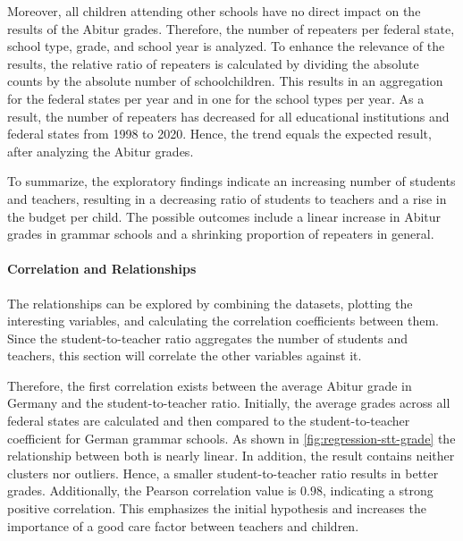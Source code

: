 Moreover, all children attending other schools have no direct impact on the results of the Abitur grades. Therefore, the number of repeaters per federal state, school type, grade, and school year is analyzed. To enhance the relevance of the results, the relative ratio of repeaters is calculated by dividing the absolute counts by the absolute number of schoolchildren. This results in an aggregation for the federal states per year and in one for the school types per year. As a result, the number of repeaters has decreased for all educational institutions and federal states from 1998 to 2020. Hence, the trend equals the expected result, after analyzing the Abitur grades.

To summarize, the exploratory findings indicate an increasing number of students and teachers, resulting in a decreasing ratio of students to teachers and a rise in the budget per child. The possible outcomes include a linear increase in Abitur grades in grammar schools and a shrinking proportion of repeaters in general.

\paragraph{Correlation and Relationships}
The relationships can be explored by combining the datasets, plotting the interesting variables, and calculating the correlation coefficients between them. Since the student-to-teacher ratio aggregates the number of students and teachers, this section will correlate the other variables against it.

Therefore, the first  correlation exists between the average Abitur grade in Germany and the student-to-teacher ratio. Initially, the average grades across all federal states are calculated and then compared to the student-to-teacher coefficient for German grammar schools. As shown in \autoref{fig:regression-stt-grade} the relationship between both is nearly linear. In addition, the result contains neither clusters nor outliers. Hence, a smaller student-to-teacher ratio results in better grades. Additionally, the Pearson correlation value is $0.98$, indicating a strong positive correlation. This emphasizes the initial hypothesis and increases the importance of a good care factor between teachers and children.


